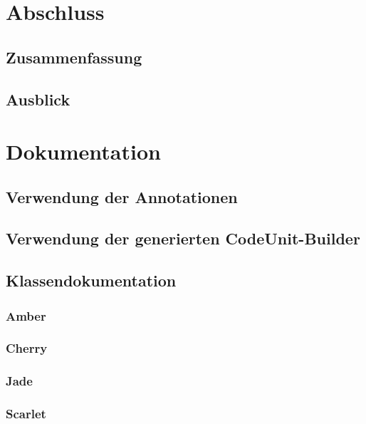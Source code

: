 \documentclass[12pt,oneside,a4paper,parskip]{scrbook}
\begin{document}
\chapter{Abschluss}
\section{Zusammenfassung}
\section{Ausblick}

\appendix
\chapter{Dokumentation}
\section{Verwendung der Annotationen}
\section{Verwendung der generierten CodeUnit-Builder}
\section{Klassendokumentation}
\subsection{Amber}
\subsection{Cherry}
\subsection{Jade}
\subsection{Scarlet}


\backmatter

\listoffigures
{}

\listoftables

\end{document}
